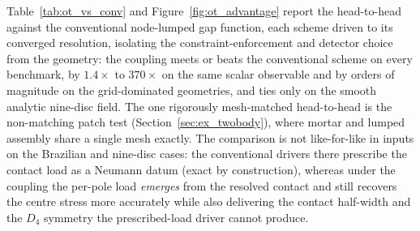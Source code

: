 \documentclass{svjour3}                 %
\begin{document}
Table~\ref{tab:ot_vs_conv} and Figure~\ref{fig:ot_advantage} report the head-to-head against the conventional
node-lumped gap function, each scheme driven to its converged resolution, isolating the constraint-enforcement and
detector choice from the geometry: the coupling meets or beats the conventional scheme on every benchmark, by
$1.4\times$ to $370\times$ on the same scalar observable and by orders of magnitude on the grid-dominated
geometries, and ties only on the smooth analytic nine-disc field. The one rigorously mesh-matched head-to-head is
the non-matching patch test (Section~\ref{sec:ex_twobody}), where mortar and lumped assembly share a single mesh
exactly. The comparison is not like-for-like in inputs on the Brazilian and nine-disc cases: the conventional
drivers there prescribe the contact load as a Neumann datum (exact by construction), whereas under the coupling
the per-pole load \emph{emerges} from the resolved contact and still recovers the centre stress more accurately
while also delivering the contact half-width and the $D_4$ symmetry the prescribed-load driver cannot produce.
\end{document}
